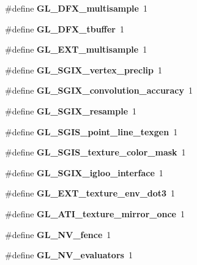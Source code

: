 \begin{DoxyCompactItemize}
\item 
\#define {\bfseries G\+L\+\_\+D\+F\+X\+\_\+multisample}~1\label{_s_d_l__opengl_8h_a917729ea6a0be783ebcb8b097c6c6dd9}

\item 
\#define {\bfseries G\+L\+\_\+D\+F\+X\+\_\+tbuffer}~1\label{_s_d_l__opengl_8h_aaa92a52b93b294b4c34b5f22337a92a0}

\item 
\#define {\bfseries G\+L\+\_\+\+E\+X\+T\+\_\+multisample}~1\label{_s_d_l__opengl_8h_a6550f80ab48388d5a38536976a387408}

\item 
\#define {\bfseries G\+L\+\_\+\+S\+G\+I\+X\+\_\+vertex\+\_\+preclip}~1\label{_s_d_l__opengl_8h_a86b9b582ba913cf87a166081a14a86e4}

\item 
\#define {\bfseries G\+L\+\_\+\+S\+G\+I\+X\+\_\+convolution\+\_\+accuracy}~1\label{_s_d_l__opengl_8h_ac4880640dcf0966bae842894274dfbfb}

\item 
\#define {\bfseries G\+L\+\_\+\+S\+G\+I\+X\+\_\+resample}~1\label{_s_d_l__opengl_8h_afc10e823ceca29a212a4ec3cd7afdcf1}

\item 
\#define {\bfseries G\+L\+\_\+\+S\+G\+I\+S\+\_\+point\+\_\+line\+\_\+texgen}~1\label{_s_d_l__opengl_8h_a1c8b64fd51364fe376de8b8fb7b807f2}

\item 
\#define {\bfseries G\+L\+\_\+\+S\+G\+I\+S\+\_\+texture\+\_\+color\+\_\+mask}~1\label{_s_d_l__opengl_8h_a4f65cbc5171bce0bc66c796117e40b00}

\item 
\#define {\bfseries G\+L\+\_\+\+S\+G\+I\+X\+\_\+igloo\+\_\+interface}~1\label{_s_d_l__opengl_8h_a4400f1af873c7efbbeb0e33a204eb169}

\item 
\#define {\bfseries G\+L\+\_\+\+E\+X\+T\+\_\+texture\+\_\+env\+\_\+dot3}~1\label{_s_d_l__opengl_8h_a284a74054c5e8a7d24666d9aa42d7724}

\item 
\#define {\bfseries G\+L\+\_\+\+A\+T\+I\+\_\+texture\+\_\+mirror\+\_\+once}~1\label{_s_d_l__opengl_8h_a8c17b096e1a91c28e77ba1e9d8dca595}

\item 
\#define {\bfseries G\+L\+\_\+\+N\+V\+\_\+fence}~1\label{_s_d_l__opengl_8h_aebdc60727d4ecdff3a2852131eea9327}

\item 
\#define {\bfseries G\+L\+\_\+\+N\+V\+\_\+evaluators}~1\label{_s_d_l__opengl_8h_a59353da1f6f92b69ca28a385b432bb85}


\end{DoxyCompactItemize}
